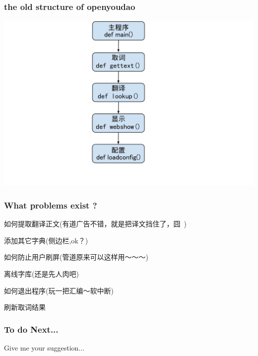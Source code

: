 \documentclass[10pt]{beamer}
\begin{document}
\begin{CJK*}{UTF8}{song}
\begin{frame}
\begin{center}
\end{center}

\end{frame}

\begin{frame}
  \frametitle{\Large{the old structure  of openyoudao}}
\begin{center} 
  \includegraphics[width=1.15\textwidth]{construct.jpg}
     
\end{center}

\end{frame}
\begin{frame}
  \frametitle{\Large{What problems exist ?}}
\begin{itemize}
{ 
  \item 如何提取翻译正文(有道广告不错，就是把译文挡住了，囧~) 
  \item 添加其它字典(侧边栏,ok？)
  \item 如何防止用户刷屏(管道原来可以这样用～～～)
  \item 离线字库(还是先人肉吧)
  \item 如何退出程序(玩一把汇编～软中断) 
  \item 刷新取词结果
}
\end{itemize}

\end{frame}

\begin{frame}
  \frametitle{\Large{To do Next... }}
\Huge{Give me your suggestion...}


\end{frame}
\end{CJK*}
\end{document}
